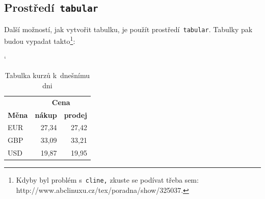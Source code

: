 \documentclass[a4paper,11pt,titlepage]{article}
\begin{document}
	\subsection{Prostředí\texttt{ tabular}}
	Další možností, jak vytvořit tabulku, je použít prostředí\texttt{ tabular}. Tabulky pak budou
vypadat takto\footnote{Kdyby byl problém s\texttt{ cline,} zkuste se podívat třeba sem:
http://www.abclinuxu.cz/tex/poradna/show/325037.}:

\bigskip
\begin{table}[h]
\begin{center}
\catcode`
\begin{tabular}{|l|r|r|} \hline
    & \multicolumn{2}{|c|}{\textbf{Cena}}\\\cline{2-3}
    \textbf{Měna} & \textbf{nákup} & \textbf{prodej}\\ \hline
    EUR & 27,34 & 27,42\\
    GBP & 33,09 & 33,21\\
    USD & 19,87 & 19,95\\ \hline
\end{tabular}
\caption{Tabulka kurzů k~dnešnímu dni}
\label{courses}
\end{center}
\end{table}
\end{document}
